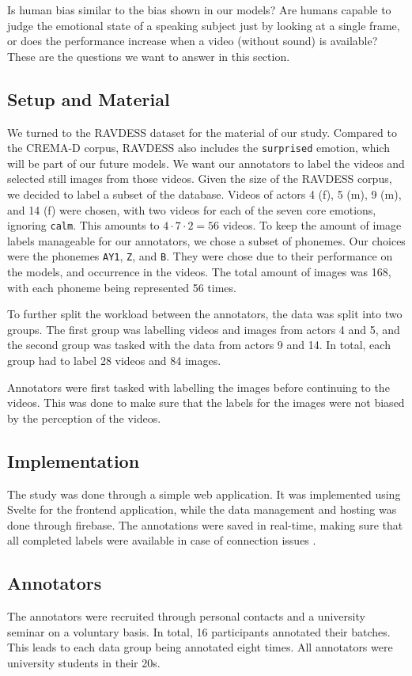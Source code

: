 Is human bias similar to the bias shown in our models? Are humans capable to judge the emotional state of a speaking subject just by looking at a single frame, or does the performance increase when a video (without sound) is available? These are the questions we want to answer in this section.

\subsection{Setup and Material}
We turned to the RAVDESS dataset \cite{livingstone2018ryerson} for the material of our study. Compared to the CREMA-D corpus, RAVDESS also includes the \texttt{surprised} emotion, which will be part of our future models. We want our annotators to label the videos and selected still images from those videos. Given the size of the RAVDESS corpus, we decided to label a subset of the database. Videos of actors 4 (f), 5 (m), 9 (m), and 14 (f) were chosen, with two videos for each of the seven core emotions, ignoring \texttt{calm}. This amounts to $4 \cdot 7 \cdot 2 = 56$ videos. To keep the amount of image labels manageable for our annotators, we chose a subset of phonemes. Our choices were the phonemes \texttt{AY1}, \texttt{Z}, and \texttt{B}. They were chose due to their performance on the models, and occurrence in the videos. The total amount of images was 168, with each phoneme being represented 56 times.

To further split the workload between the annotators, the data was split into two groups. The first group was labelling videos and images from actors 4 and 5, and the second group was tasked with the data from actors 9 and 14. In total, each group had to label 28 videos and 84 images.

Annotators were first tasked with labelling the images before continuing to the videos. This was done to make sure that the labels for the images were not biased by the perception of the videos.

\subsection{Implementation}
The study was done through a simple web application. It was implemented using Svelte for the frontend application, while the data management and hosting was done through firebase. The annotations were saved in real-time, making sure that all completed labels were available in case of connection issues \cite{baur2021}.

\subsection{Annotators}
The annotators were recruited through personal contacts and a university seminar on a voluntary basis. In total, 16 participants annotated their batches. This leads to each data group being annotated eight times. All annotators were university students in their 20s.

